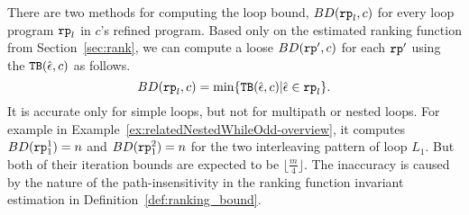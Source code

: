 
There are two methods for computing the loop bound, $BD(\mathtt{rp}_l, c)$ for every loop program $\mathtt{rp}_l$ in $c$'s refined program.
%
Based only on the estimated ranking function from Section~\ref{sec:rank}, we can compute a loose $BD(\mathtt{rp}', c)$ for each $\mathtt{rp}'$
using the ${\mathtt{TB}}(\hat{\mathtt{\epsilon}{}}, c)$ as follows.
\begin{equation}
 \label{eq:absBD}
 BD(\rprog_l, c) = \min\left\{ \absclr(\absevent, c) \middle\vert \absevent \in \rprog_l \right\}.
\end{equation}
It is accurate only for simple loops, but not for multipath or nested loops.
For example in Example~\ref{ex:relatedNestedWhileOdd-overview},
it computes $BD(\mathtt{rp}_1^1) = n$ and $BD(\mathtt{rp}_1^2) = n $ for the two interleaving pattern of loop $L_1$.
But both of their iteration bounds are expected to be $\lfloor\frac{m}{4}\rfloor$.
The inaccuracy is caused by the nature of the path-insensitivity in the ranking function invariant estimation in Definition~\ref{def:ranking_bound}. 

